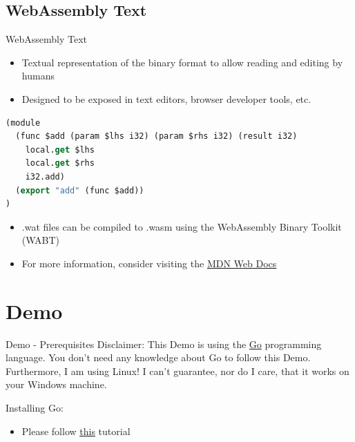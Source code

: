 \documentclass{beamer}
\begin{document}
\subsection{WebAssembly Text}
\begin{frame}[fragile]{WebAssembly Text}
    \begin{itemize}
        \item Textual representation of the binary format to allow reading and editing by humans
        \item Designed to be exposed in text editors, browser developer tools, etc.
    \end{itemize}
    \begin{lstlisting}[language=Lisp,basicstyle=\scriptsize]
(module
  (func $add (param $lhs i32) (param $rhs i32) (result i32)
    local.get $lhs
    local.get $rhs
    i32.add)
  (export "add" (func $add))
)
    \end{lstlisting}
    \begin{itemize}
        \item .wat files can be compiled to .wasm using the WebAssembly Binary Toolkit (WABT)
        \item For more information, consider visiting the \href{https://developer.mozilla.org/en-US/docs/WebAssembly/Understanding_the_text_format}{MDN Web Docs}
    \end{itemize}
\end{frame}

\section{Demo}

\begin{frame}{Demo - Prerequisites}
    Disclaimer: This Demo is using the \href{https://go.dev/}{Go} programming language. You don't need any knowledge about Go to follow this Demo. Furthermore, I am using Linux! I can't guarantee, nor do I care, that it works on your Windows machine.

    Installing Go:
    \begin{itemize}
        \item Please follow \underline{\href{https://go.dev/doc/install}{this}} tutorial
    \end{itemize}

\end{frame}
\end{document}
